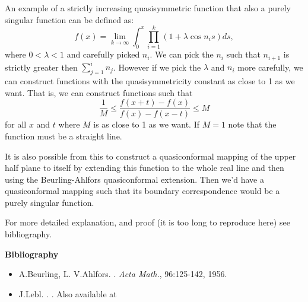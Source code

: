 \documentclass[12pt]{article}
\begin{document}
An example of a strictly increasing quasisymmetric function that also a purely singular function can be defined as:
\begin{equation*}
f(x) = \lim_{k \rightarrow \infty} \int_0^x \prod_{i=1}^k (1 + \lambda \cos n_i s) ds ,
\end{equation*}
where $0< \lambda < 1$ and carefully picked $n_i$.
We can pick the $n_i$ such that $n_{i+1}$ is strictly
greater then $\sum_{j=1}^i n_j$.  However if we pick the $\lambda$
and $n_i$ more carefully, we can construct functions with the quasisymmetricity
constant as close to 1 as we want.  That is, we can construct functions such that
\begin{equation*}
\frac{1}{M} 
\leq
\frac{f(x+t)-f(x)}{f(x)-f(x-t)}
\leq
M
\end{equation*}
for all $x$ and $t$ where $M$ is as close to 1 as we want.  If $M=1$ note that
the function must be a straight line.

It is also possible from this to construct a quasiconformal mapping of the upper half plane to itself by extending this function to the whole real line and then using the Beurling-Ahlfors quasiconformal extension.  Then we'd have a quasiconformal mapping such that its boundary correspondence would be a purely singular function.

For more detailed explanation,  and
proof (it is too long to reproduce here) see bibliography.

{\bf Bibliography}

\begin{itemize}
\item
A.\@ Beurling, L\@. V.\@ Ahlfors.  .  \emph{Acta Math.}, 96:125-142,
1956.
\item
J.\@ Lebl.  \emph{}.  .  Also available at
\end{itemize}
\end{document}
